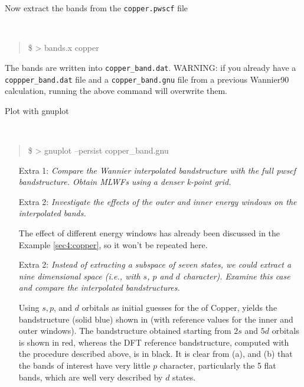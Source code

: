 \begin{tcolorbox}[colback=blue!5!white,title=BANDS.X MINITUTORIAL,float]
{\begin{itemize}
    Now extract the bands from the {\tt copper.pwscf} file
    {\tt
    \begin{quote}
    \$ > bands.x copper
    \end{quote}
    }
    The bands are written into {\tt copper\_band.dat}. WARNING: if you already have a {\tt coppper\_band.dat} file and a {\tt copper\_band.gnu} file from a previous Wannier90 calculation, running the above command will overwrite them.

    Plot with gnuplot
    {\tt
    \begin{quote}
    \$ > gnuplot --persist copper\_band.gnu
    \end{quote}
    }
\end{itemize}
}
    \end{tcolorbox}

\begin{enumerate}
	\item [Extra 1:] {\it Compare the Wannier interpolated bandstructure with the full pwscf bandstructure. Obtain MLWFs using a denser k-point grid.}



    \item [Extra 2:] {\it Investigate the effects of the outer and inner energy windows on the interpolated bands.}

    The effect of different energy windows has already been discussed in the Example \ref{sec4:copper}, so it won't be repeated here.

    \item [Extra 2:] {\it Instead of extracting a subspace of seven states, we could extract a nine dimensional space (i.e., with $s$, $p$ and $d$ character). Examine this case and compare the interpolated bandstructures.}

    Using $s,p$, and $d$ orbitals as initial guesses for the \MLWFs{} of Copper, yields the bandstructure (solid blue) shown in  (with reference values for the inner and outer windows). The bandstructure obtained starting from $2s$ and $5d$ orbitals is shown in red, whereas the DFT reference bandstructure, computed with the procedure described above, is in black. It is clear from (a), and (b) that the bands of interest have very little $p$ character, particularly the 5 flat bands, which are well very described by $d$ states.

\end{enumerate}
